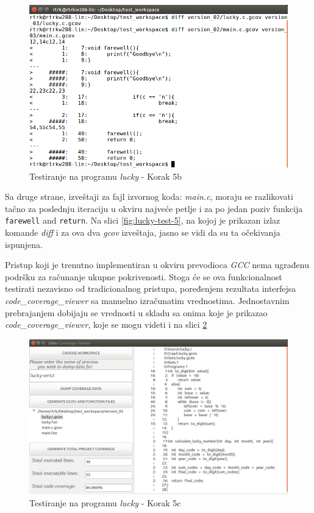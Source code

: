 \documentclass[12pt,oneside]{memoir}
\newcommand{\kod}[1]{\texttt{#1}}
\newcommand{\strano}[1]{\textit{#1}}
\begin{document}
\begin{figure}[!ht]
  \centering
  \includegraphics[width=\textwidth]{img/lucky6-ng.png}
  \caption{Testiranje na programu \strano{lucky} - Korak 5b}
  \label{fig:lucky-test-6}
\end{figure}

Sa druge strane, izveštaji za fajl izvornog koda: \strano{main.c}, moraju se razlikovati tačno za poslednju iteraciju u okviru najveće petlje i za po jedan poziv funkcija \kod{farewell} and \kod{return}. Na slici \ref{fig:lucky-test-5}, na kojoj je prikazan izlaz komande \strano{diff} i za ova dva \strano{gcov} izveštaja, jasno se vidi da su ta očekivanja ispunjena. 

Pristup koji je trenutno implementiran u okviru prevodioca \strano{GCC} nema ugrađenu podršku za računanje ukupne pokrivenosti. Stoga će se ova funkcionalnost testirati nezavisno od tradicionalnog pristupa, poređenjem rezultata interfejsa \\ \strano{code\_coverage\_viewer} sa manuelno izračunatim vrednostima. Jednostavnim prebrajanjem dobijaju se vrednosti u skladu sa onima koje je prikazao \\ \strano{code\_coverage\_viewer}, koje se mogu videti i na slici \ref{fig:lucky-test-7}

\begin{figure}[!ht]
  \centering
  \includegraphics[width=\textwidth]{img/lucky7-ng.png}
  \caption{Testiranje na programu \strano{lucky} - Korak 5c}
  \label{fig:lucky-test-7}
\end{figure}
\end{document}
